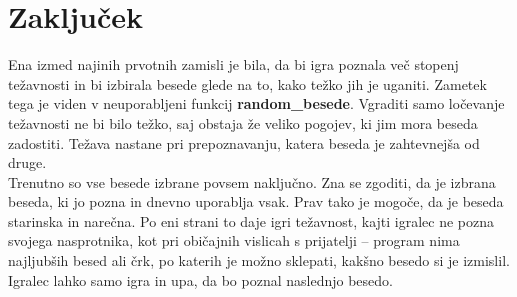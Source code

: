 \documentclass [a4paper, 12pt] {article}
\begin{document}
\section {Zaključek}
Ena izmed najinih prvotnih zamisli je bila, da bi igra poznala več stopenj težavnosti in bi izbirala besede glede na to, kako težko jih je uganiti. Zametek tega je viden v neuporabljeni funkcij \textbf {random\_besede}. Vgraditi samo ločevanje težavnosti ne bi bilo težko, saj obstaja že veliko pogojev, ki jim mora beseda zadostiti. Težava nastane pri prepoznavanju, katera beseda je zahtevnejša od druge. \\
Trenutno so vse besede izbrane povsem naključno. Zna se zgoditi, da je izbrana beseda, ki jo pozna in dnevno uporablja vsak. Prav tako je mogoče, da je beseda starinska in narečna. Po eni strani to daje igri težavnost, kajti igralec ne pozna svojega nasprotnika, kot pri običajnih vislicah s prijatelji -- program nima najljubših besed ali črk, po katerih je možno sklepati, kakšno besedo si je izmislil. Igralec lahko samo igra in upa, da bo poznal naslednjo besedo. 
\end{document}
